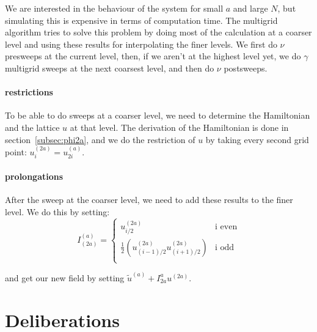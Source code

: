 \documentclass{scrartcl}
\begin{document}
We are interested in the behaviour of the system for small $a$ and large $N$, but simulating this is expensive in terms of computation time. The multigrid algorithm tries to solve this problem by doing most of the calculation at a coarser level and using these results for interpolating the finer levels.
We first do $\nu$ presweeps at the current level, then, if we aren't at the highest level yet, we do $\gamma$ multigrid sweeps at the next coarsest level, and then do $\nu$ postsweeps.

\paragraph{restrictions}
To be able to do sweeps at a coarser level, we need to determine the Hamiltonian and the lattice $u$ at that level. The derivation of the Hamiltonian is done in section~\ref{subsec:phi2a}, and we do the restriction of $u$ by taking every second grid point: $u_i^{(2a)}=u_{2i}^{(a)}$.

\paragraph{prolongations}
After the sweep at the coarser level, we need to add these results to the finer level. We do this by setting:\[
I^{(a)}_{(2a)}=\begin{cases}
u_{i/2}^{(2a)}& \text{i even}\\
\frac{1}{2}\left(u_{(i-1)/2}^{(2a)}u_{(i+1)/2}^{(2a)}\right) & \text{i odd}\\
\end{cases}
\]

and get our new field by setting $\tilde{u}^{(a)}+I_{2a}^au^{(2a)}$.

\section{Deliberations}
\end{document}
